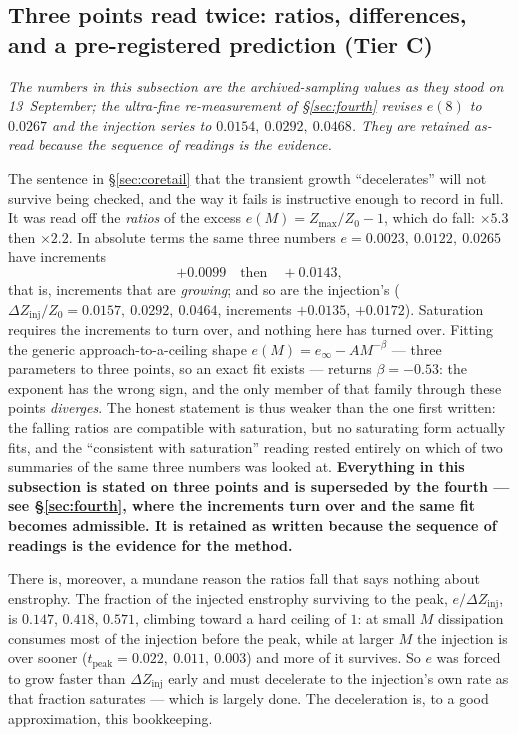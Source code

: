 \documentclass[11pt,a4paper]{article}
\newcommand{\tC}{\textcolor{TierC}{\textbf{Tier C}}}
\theoremstyle{definition}
\theoremstyle{plain}
\begin{document}
\subsection{Three points read twice: ratios, differences, and a pre-registered prediction (\tC{})}
\label{sec:series}

\emph{The numbers in this subsection are the archived-sampling values as they stood on
13~September; the ultra-fine re-measurement of \S\ref{sec:fourth} revises $e(8)$ to $0.0267$
and the injection series to $0.0154,\ 0.0292,\ 0.0468$. They are retained as-read because the
sequence of readings is the evidence.}

The sentence in \S\ref{sec:coretail} that the transient growth ``decelerates'' will not survive
being checked, and the way it fails is instructive enough to record in full. It was read off the
\emph{ratios} of the excess $e(M)=Z_{\max}/Z_0-1$, which do fall: $\times5.3$ then $\times2.2$.
In absolute terms the same three numbers $e = 0.0023,\ 0.0122,\ 0.0265$ have increments
\[
  +0.0099 \quad\text{then}\quad +0.0143,
\]
that is, increments that are \emph{growing}; and so are the injection's
($\Delta Z_{\mathrm{inj}}/Z_0 = 0.0157,\ 0.0292,\ 0.0464$, increments $+0.0135$, $+0.0172$).
Saturation requires the increments to turn over, and nothing here has turned over. Fitting the
generic approach-to-a-ceiling shape $e(M) = e_\infty - AM^{-\beta}$ --- three parameters to
three points, so an exact fit exists --- returns $\beta = -0.53$: the exponent has the wrong
sign, and the only member of that family through these points \emph{diverges}. The honest
statement is thus weaker than the one first written: the falling ratios are compatible with
saturation, but no saturating form actually fits, and the ``consistent with saturation'' reading
rested entirely on which of two summaries of the same three numbers was looked at.
\textbf{Everything in this subsection is stated on three points and is superseded by the fourth
--- see \S\ref{sec:fourth}, where the increments turn over and the same fit becomes admissible.
It is retained as written because the sequence of readings is the evidence for the method.}

There is, moreover, a mundane reason the ratios fall that says nothing about enstrophy. The
fraction of the injected enstrophy surviving to the peak, $e/\Delta Z_{\mathrm{inj}}$, is
$0.147$, $0.418$, $0.571$, climbing toward a hard ceiling of $1$: at small $M$ dissipation
consumes most of the injection before the peak, while at larger $M$ the injection is over
sooner ($t_{\mathrm{peak}} = 0.022,\ 0.011,\ 0.003$) and more of it survives. So $e$ was forced
to grow faster than $\Delta Z_{\mathrm{inj}}$ early and must decelerate to the injection's own
rate as that fraction saturates --- which is largely done. The deceleration is, to a good
approximation, this bookkeeping.
\end{document}
